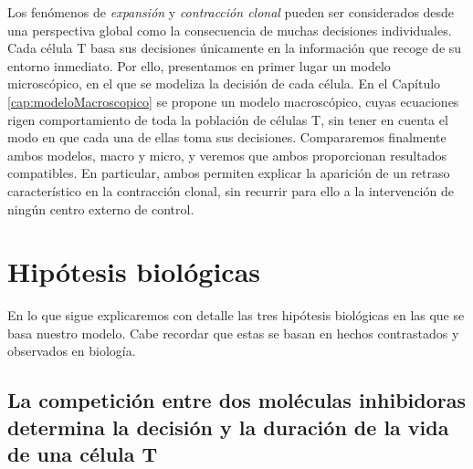 Los fenómenos de \textit{expansión} y \textit{contracción clonal} pueden ser considerados desde una perspectiva global como la consecuencia de muchas decisiones individuales. Cada célula T basa sus decisiones únicamente en la información que recoge de su entorno inmediato. Por ello, presentamos en primer lugar un modelo microscópico, en el que se modeliza la decisión de cada célula. En el Capítulo \ref{cap:modeloMacroscopico} se propone un modelo macroscópico, cuyas ecuaciones rigen comportamiento de toda la población de células T, sin tener en cuenta el modo en que cada una de ellas toma sus decisiones. Compararemos finalmente ambos modelos, macro y micro,  y veremos que ambos proporcionan resultados compatibles. En particular, ambos permiten explicar la aparición de un retraso característico en la contracción clonal, sin recurrir para ello a la intervención de ningún centro externo de control.


 
\section{Hipótesis biológicas} 
\label{sec:hip_bio}

En lo que sigue explicaremos con detalle las tres hipótesis biológicas en las que se basa nuestro modelo. Cabe recordar que estas se basan en hechos contrastados y observados en biología.%

\subsection{La competición entre dos moléculas inhibidoras determina la decisión y la duración de la vida de una célula T}
\label{subsec:hip_1}
	 
